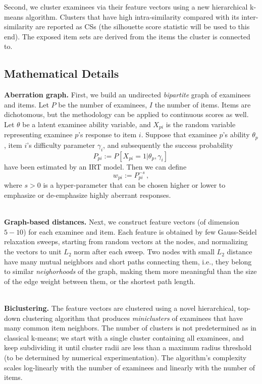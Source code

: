 \documentclass{article}
\begin{document}
Second, we cluster examinees via their feature vectors using a new hierarchical k-means algorithm. Clusters that have high intra-similarity compared with its inter-similarity are reported as CSs (the silhouette score statistic will be used to this end). The exposed item sets are derived from the items the cluster is connected to.

\subsection{Mathematical Details}
{\bf Aberration graph.} First, we build an undirected {\it bipartite} graph of examinees and items. Let $P$ be the number of examinees, $I$ the number of items. Items are dichotomous, but the methodology can be applied to continuous scores as well. Let $\theta$ be a latent examinee ability variable, and $X_{pi}$ is the random variable representing examinee $p$'s response to item $i$. Suppose that examinee $p$'s ability $\theta_p$, item $i$'s difficulty parameter $\gamma_i$, and subsequently the success probability
\begin{equation}
	P_{pi} := P \left [X_{pi}=1 | \theta_p, \gamma_i \right]\,
	\label{ppi} 
\end{equation}
have been estimated by an IRT model. Then we can define
\begin{equation}
  w_{pi} := P_{pi}^{-s} \,,
  \label{weight}
\end{equation}
where $s  > 0$ is a hyper-parameter that can be chosen higher or lower to emphasize or de-emphasize highly aberrant responses.

{\mbox{}}\\
{\bf Graph-based distances.} Next, we construct feature vectors (of dimension $5-10$) for each examinee and item. Each feature is obtained by few Gauss-Seidel relaxation sweeps, starting from random vectors  at the nodes, and normalizing the vectors to unit $L_2$ norm after each sweep. Two nodes with small $L_2$ distance have many mutual neighbors and short paths connecting them, i.e., they belong to similar {\it neighorhoods} of the graph, making them more meaningful than the size of the edge weight between them, or the shortest path length.

{\mbox{}}\\
{\bf Biclustering.} The feature vectors are clustered using a novel hierarchical, top-down clustering algorithm that produces {\it miniclusters} of examinees that have many common item neighbors. The number of clusters is not predetermined as in classical k-means; we start with a single cluster containing all examinees, and keep subdividing it until cluster radii are less than a maximum radius threshold (to be determined by numerical experimentation). The algorithm's complexity scales log-linearly with the number of examinees and linearly with the number of items. 
\end{document}
